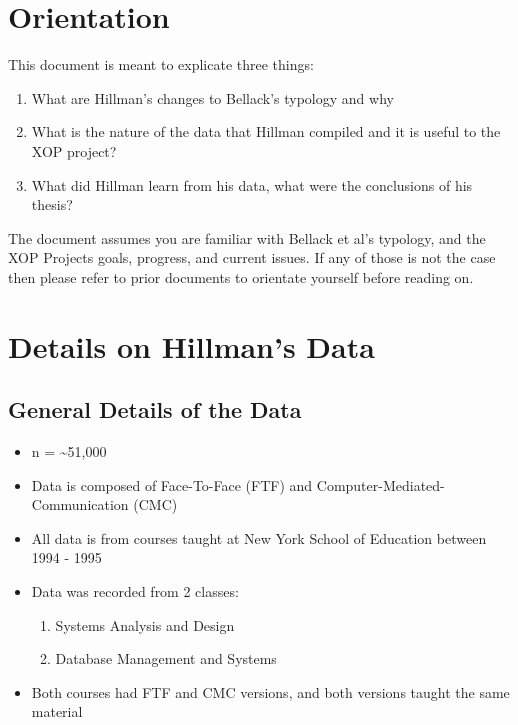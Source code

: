\documentclass[10pt, letterpaper]{article}
\begin{document}
\section*{Orientation}
\label{sec:orgc325696}
This document is meant to explicate three things:
\begin{enumerate}
\item What are Hillman's changes to Bellack's typology and why
\item What is the nature of the data that Hillman compiled and it is useful to the
XOP project?
\item What did Hillman learn from his data, what were the conclusions of his
thesis?
\end{enumerate}

The document assumes you are familiar with Bellack et al's typology, and the
XOP Projects goals, progress, and current issues. If any of those is not the
case then please refer to prior documents to orientate yourself before reading
on.
\section*{Details on Hillman's Data}
\label{sec:org304ff17}

\subsection*{General Details of the Data}
\label{sec:orge3d96a8}
\begin{itemize}
\item n = \textasciitilde{}51,000
\item Data is composed of Face-To-Face (FTF) and Computer-Mediated-Communication
(CMC)
\item All data is from courses taught at New York School of Education between
1994 - 1995
\item Data was recorded from 2 classes:
\begin{enumerate}
\item Systems Analysis and Design
\item Database Management and Systems
\end{enumerate}
\item Both courses had FTF and CMC versions, and both versions taught the same
material
\end{itemize}
\end{document}

